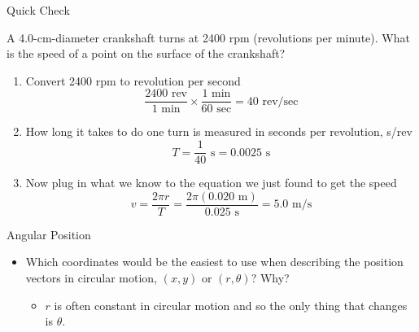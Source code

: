 \documentclass{beamer}
\begin{document}
\begin{frame}{Quick Check}
\begin{center}
   A 4.0-cm-diameter crankshaft turns at 2400 rpm (revolutions per minute). What is the speed of a point on the surface of the crankshaft?
   \begin{enumerate}
   \item<2-> Convert 2400 rpm to revolution per second
   \begin{equation*}
      \frac{2400 \text{ rev}}{1 \text{ min}} \times \frac{1 \text{ min}}{60 \text{ sec}} = 40 \text{ rev/sec}
   \end{equation*}
   \item<3-> How long it takes to do one turn is measured in seconds per revolution, s/rev
   \begin{equation*}
      T=\frac{1}{40}\text{ s} = 0.0025\text{ s}
   \end{equation*}
   \item<4-> Now plug in what we know to the equation we just found to get the speed
   \begin{equation*}
      v=\frac{2\pi r}{T} = \frac{2\pi(0.020\text{ m})}{0.025\text{ s}} = 5.0\text{ m/s}
   \end{equation*}
   \end{enumerate}
\end{center}
\end{frame}

\begin{frame}{Angular Position}
\begin{itemize}
   \item Which coordinates would be the easiest to use when describing the position vectors in circular motion, $(x,y)$ or $(r,\theta)$? Why?
   \begin{itemize}
      \item<2-> $r$ is often constant in circular motion and so the only thing that changes is $\theta$.
   \end{itemize}
\end{itemize}
\end{frame}
\end{document}
